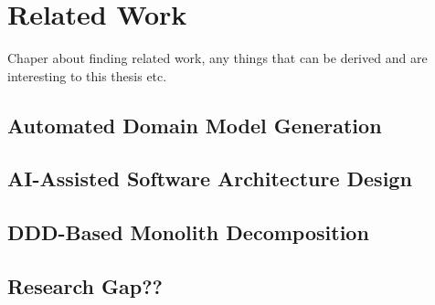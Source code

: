 \chapter{Related Work}
Chaper about finding related work, any things that can be derived and are interesting to this thesis etc.
\section{Automated Domain Model Generation}
\section{AI-Assisted Software Architecture Design}
\section{DDD-Based Monolith Decomposition}
\section{Research Gap??}